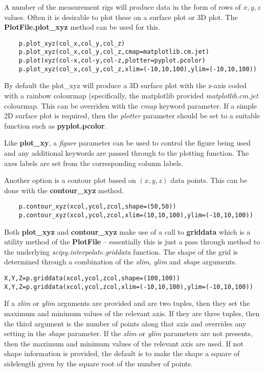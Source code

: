 \documentclass[a4paper,11pt]{scrartcl}
\begin{document}
 A number of the measurement rigs will produce data in the form of rows of $x,y,z$ values. Often it is desirable to plot these on a surface plot or 3D plot. The \textbf{PlotFile.plot\_xyz} method can be used for this.

 \begin{lstlisting}
    p.plot_xyz(col_x,col_y,col_z)
    p.plot_xyz(col_x,col_y,col_z,cmap=matplotlib.cm.jet)
    p.plot)xyz(col-x,col-y,col-z,plotter=pyplot.pcolor)
    p.plot_xyz(col_x,col_y,col_z,xlim=(-10,10,100),ylim=(-10,10,100))
 \end{lstlisting}

 By default the plot\_xyz will produce a 3D surface plot with the z-axis coded with a rainbow colourmap (specifically, the matplotlib provided \textit{matplotlib.cm.jet} colourmap. This can be overriden with the \textit{cmap} keyword parameter. If a simple 2D surface plot is required, then the \textit{plotter} parameter should be set to a suitable function such as \textbf{pyplot.pcolor}.

 Like \textbf{plot\_xy}, a \textit{figure} parameter can be used to control the figure being used and any additional keywords are passed through to the plotting function. The axes labels are set from the corresponding column labels.
 
 Another option is a contour plot based on $(x,y,z)$ data points. This can be done with the \textbf{contour\_xyz} method.
 
 \begin{lstlisting}
 	p.contour_xyz(xcol,ycol,zcol,shape=(50,50))
 	p.contour_xyz(xcol,ycol,zcol,xlim=(10,10,100),ylim=(-10,10,100))
\end{lstlisting} 	

Both \textbf{plot\_xyz} and \textbf{contour\_xyz} make use of a call to \textbf{griddata} which is a utility method of the \textbf{PlotFile} -- essentially this is just a pass through method to the underlying \textit{scipy.interpolate.griddata} function. The shape of the grid is determined through a combination of the \textit{xlim}, \textit{ylim} and \textit{shape} arguments.

\begin{lstlisting}
X,Y,Z=p.griddata(xcol,ycol,zcol,shape=(100,100))
X,Y,Z=p.griddata(xcol,ycol,zcol,xlim=(-10,10,100),ylim=(-10,10,100))
\end{lstlisting}

If a \textit{xlim} or \textit{ylim} arguments are provided and are two tuples, then they set the maximum and minimum values of the relevant axis. If they are three tuples, then the third argument is the number of points along that axis and overrides any setting in the \textit{shape} parameter. If the \textit{xlim} or \textit{ylim} parameters are not presents, then the maximum and minimum values of the relevant axis are used. If not shape information is provided, the default is to make the shape a square of sidelength given by the square root of the number of points.
\end{document}

